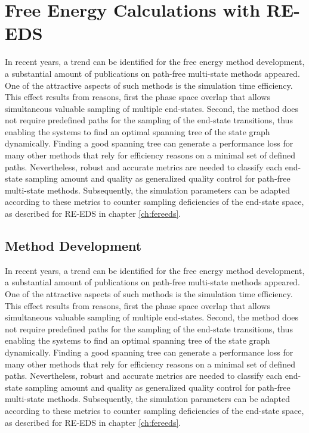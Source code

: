 
\section{Free Energy Calculations with RE-EDS}
In recent years, a trend can be identified for the free energy method development, a substantial amount of publications on path-free multi-state methods appeared. \cite{Donnini2011, Knight2011, Bieler2015, Sidler2016, Perthold2018} One of the attractive aspects of such methods is the simulation time efficiency. This effect results from reasons, first the phase space overlap that allows simultaneous valuable sampling of multiple end-states.  Second, the method does not require predefined paths for the sampling of the end-state transitions, thus enabling the systems to find an optimal spanning tree of the state graph dynamically. Finding a good spanning tree can generate a performance loss for many other methods that rely for efficiency reasons on a minimal set of defined paths.\cite{Jespers2019}
Nevertheless, robust and accurate metrics are needed to classify each end-state sampling amount and quality as generalized quality control for path-free multi-state methods. Subsequently, the simulation parameters can be adapted according to these metrics to counter sampling deficiencies of the end-state space, as described for RE-EDS in chapter \ref{ch:fereeds}. 

\subsection{Method Development}
In recent years, a trend can be identified for the free energy method development, a substantial amount of publications on path-free multi-state methods appeared. \cite{Donnini2011, Knight2011, Bieler2015, Sidler2016, Perthold2018} One of the attractive aspects of such methods is the simulation time efficiency. This effect results from reasons, first the phase space overlap that allows simultaneous valuable sampling of multiple end-states.  Second, the method does not require predefined paths for the sampling of the end-state transitions, thus enabling the systems to find an optimal spanning tree of the state graph dynamically. Finding a good spanning tree can generate a performance loss for many other methods that rely for efficiency reasons on a minimal set of defined paths.\cite{Jespers2019}
Nevertheless, robust and accurate metrics are needed to classify each end-state sampling amount and quality as generalized quality control for path-free multi-state methods. Subsequently, the simulation parameters can be adapted according to these metrics to counter sampling deficiencies of the end-state space, as described for RE-EDS in chapter \ref{ch:fereeds}. 

